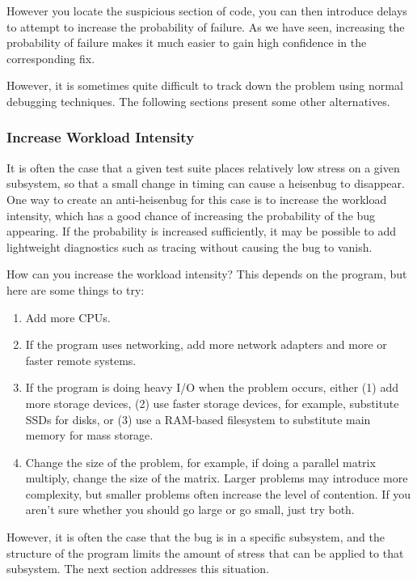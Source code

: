 However you locate the suspicious section of code, you can then introduce
delays to attempt to increase the probability of failure.
As we have seen, increasing the probability of failure makes it much
easier to gain high confidence in the corresponding fix.

However, it is sometimes quite difficult to track down the problem using
normal debugging techniques.
The following sections present some other alternatives.

\subsubsection{Increase Workload Intensity}
\label{sec:debugging:Increase Workload Intensity}

It is often the case that a given test suite places relatively
low stress on a given subsystem, so that a small change in timing
can cause a heisenbug to disappear.
One way to create an anti-heisenbug for this case is to increase
the workload intensity, which has a good chance of increasing the
probability of the bug appearing.
If the probability is increased sufficiently, it may be possible to
add lightweight diagnostics such as tracing without causing the
bug to vanish.

How can you increase the workload intensity?
This depends on the program, but here are some things to try:

\begin{enumerate}
\item	Add more CPUs.
\item	If the program uses networking, add more network adapters
	and more or faster remote systems.
\item	If the program is doing heavy I/O when the problem occurs,
	either (1) add more storage devices, (2) use faster storage
	devices, for example, substitute SSDs for disks,
	or (3) use a RAM-based filesystem to substitute main
	memory for mass storage.
\item	Change the size of the problem, for example, if doing a parallel
	matrix multiply, change the size of the matrix.
	Larger problems may introduce more complexity, but smaller
	problems often increase the level of contention.
	If you aren't sure whether you should go large or go small,
	just try both.
\end{enumerate}

However, it is often the case that the bug is in a specific subsystem,
and the structure of the program limits the amount of stress that can
be applied to that subsystem.
The next section addresses this situation.

